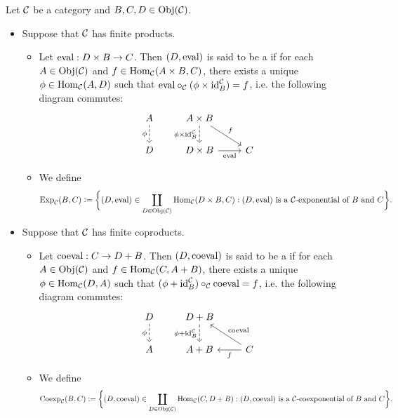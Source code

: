 \documentclass{book}
\begin{document}
	\begin{defn}
		Let $\mathcal{C}$ be a category and $B,C, D \in \operatorname{Obj}(\mathcal{C})$.
		\begin{itemize}
			\item Suppose that $\mathcal{C}$ has finite products.  
			\begin{itemize}
				\item Let $\text{eval}: D \times B \rightarrow C$. Then $(D, \text{eval})$ is said to be a  if for each $A \in \operatorname{Obj}(\mathcal{C})$ and $f \in \operatorname{Hom}_{\mathcal{C}}(A \times B, C)$, there exists a unique $\phi \in \operatorname{Hom}_{\mathcal{C}}(A, D)$ such that $\text{eval} \circ_{\mathcal{C}} (\phi \times \operatorname{id}_B^{\mathcal{C}}) = f$, i.e. the following diagram commutes: 
				\[ 
				\begin{tikzcd}[baseline= 7]
					A \arrow[d, "\phi"', dashed] & A \times B  \arrow[d, "\phi \times \id_B^{\MC}"', dashed]  \arrow[dr, "f"] &  \\
					D                           & D \times B  \arrow[r, "\eval"'] & C 
				\end{tikzcd}
				\]
				\item We define 
				$$\operatorname{Exp}_{\mathcal{C}}(B, C) \vcentcolon= \bigg \{(D, \text{eval}) \in \coprod\limits_{D \in \operatorname{Obj}(\mathcal{C})}\operatorname{Hom}_{\mathcal{C}}(D \times B, C): \text{$(D, \text{eval})$ is a $\mathcal{C}$-exponential of $B$ and $C$} \bigg \}.$$
			\end{itemize}
			\item Suppose that $\mathcal{C}$ has finite coproducts.
			\begin{itemize}
				\item Let $\text{coeval}: C \rightarrow D + B$. Then $(D, \text{coeval})$ is said to be a  if for each $A \in \operatorname{Obj}(\mathcal{C})$ and $f \in \operatorname{Hom}_{\mathcal{C}}(C, A + B)$, there exists a unique $\phi \in \operatorname{Hom}_{\mathcal{C}}(D, A)$ such that $ (\phi + \operatorname{id}_B^{\mathcal{C}}) \circ_{\mathcal{C}} \text{coeval} = f$, i.e. the following diagram commutes: 
				\[ 
				\begin{tikzcd}[baseline= 7]
					D \arrow[d, "\phi"', dashed] & D+B  \arrow[d, "\phi + \id_B^{\MC}"', dashed]  &  \\
					A                           & A+B   & C \arrow[l, "f"]  \arrow[ul, "\coeval"']
				\end{tikzcd}
				\]
				\item We define 
				$$\operatorname{Coexp}_{\mathcal{C}}(B, C) \vcentcolon= \bigg \{(D, \text{coeval}) \in \coprod\limits_{D \in \operatorname{Obj}(\mathcal{C})}\operatorname{Hom}_{\mathcal{C}}(C, D + B): \text{$(D, \text{coeval})$ is a $\mathcal{C}$-coexponential of $B$ and $C$} \bigg \}.$$
			\end{itemize}
		\end{itemize}
	\end{defn}
	
\end{document}
